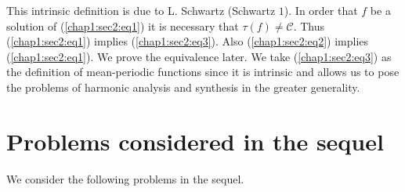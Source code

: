  This intrinsic definition is due to L. Schwartz (Schwartz $1$). In
 order that $f$ be a solution of (\ref{chap1:sec2:eq1}) it is
 necessary that $ \tau 
 (f) \neq \mathscr{C}$. Thus (\ref{chap1:sec2:eq1}) implies
 (\ref{chap1:sec2:eq3}). Also (\ref{chap1:sec2:eq2})
 implies (\ref{chap1:sec2:eq1}). We prove the equivalence later. We
 take (\ref{chap1:sec2:eq3}) as 
 the definition of mean-periodic functions since it is intrinsic
 and allows us to pose the problems of harmonic analysis and
 synthesis in the greater generality. 

\section{Problems considered in the sequel}\label{chap1:sec3}%

We consider the following problems in the sequel.


